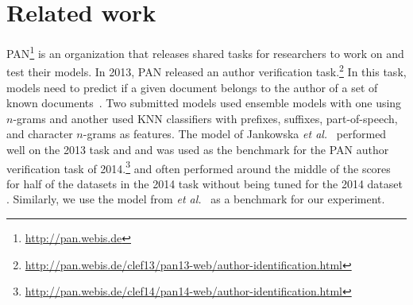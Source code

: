 \documentclass[11pt]{article}
\begin{document}
\section{Related work} \label{litReview}




PAN\footnote{\url{http://pan.webis.de}} is an organization that releases shared tasks for researchers to work on and test their models. In 2013, PAN released an author verification task.\footnote{\url{http://pan.webis.de/clef13/pan13-web/author-identification.html}} In this task, models need to predict if a given document belongs to the author of a set of known documents~\cite{Stamatatos:2013}. Two submitted models used ensemble models with one using $n$-grams and another used KNN classifiers with  prefixes, suffixes, part-of-speech, and character $n$-grams as features.  The model of Jankowska \emph{et   al.}~\cite{jankowska2014} performed well on the 2013 task and and was used as the benchmark for the PAN author verification task of 2014.\footnote{\url{http://pan.webis.de/clef14/pan14-web/author-identification.html}} and often performed around the middle of the scores for half of the datasets in the 2014 task without being tuned for the 2014 dataset \cite{stamatatos:2014}. Similarly, we use the model from \emph{et   al.}~\cite{jankowska2014} as a benchmark for our experiment.
\end{document}

